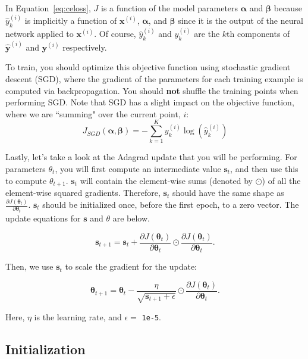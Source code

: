 \documentclass[11pt,addpoints,answers]{exam}
\newcommand{\sv}{\mathbf{s}}
\newcommand{\xv}{\mathbf{x}}
\newcommand{\yv}{\mathbf{y}}
\newcommand{\alphav     }{\boldsymbol \alpha     }
\newcommand{\betav      }{\boldsymbol \beta      }
\newcommand{\thetav     }{\boldsymbol \theta     }
\begin{document}
In Equation~\ref{eq:celoss}, $J$ is a function of the model parameters $\alphav$ and $\betav$ because $\hat{y}^{(i)}_k$ is implicitly a function of $\xv^{(i)}$, $\alphav$, and $\betav$ since it is the output of the neural network applied to $\xv^{(i)}$. Of course, $\hat{y}^{(i)}_k$ and $y_k^{(i)}$ are the $k$th components of $\hat{\yv}^{(i)}$ and $\yv^{(i)}$ respectively.

To train, you should optimize this objective function using stochastic gradient descent (SGD), where the gradient of the parameters for each training example is computed via backpropagation. You should \textbf{not} shuffle the training points when performing SGD. Note that SGD has a slight impact on the objective function, where we are ``summing" over the current point, $i$:
\begin{equation}
\label{eq:sgd_celoss}
J_{SGD}(\alphav, \betav)= -\sum_{k=1}^{K} y_k^{(i)} \log (\hat{y}^{(i)}_k)
\end{equation}

Lastly, let's take a look at the Adagrad update that you will be performing. For parameters $\theta_t$, you will first compute an intermediate value $\sv_t$, and then use this to compute $\theta_{t+1}$.
$\sv_t$ will contain the element-wise sums (denoted by $\odot$) of all the element-wise squared gradients. Therefore, $\sv_t$ should have the same shape as $\frac{\partial J(\thetav_{t})}{\partial \thetav_t}$. $\sv_t$ should be initialized once, before the first epoch, to a zero vector. The update equations for $\sv$ and $\theta$ are below.

\begin{equation}
    \label{eq:adagrad_s}
    \sv_{t+1} = \sv_{t} + \frac{\partial J(\thetav_{t})}{\partial \thetav_t} \odot \frac{\partial J(\thetav_{t})}{\partial \thetav_t}.
\end{equation}

Then, we use $\sv_t$ to scale the gradient for the update:

\begin{equation}
    \label{eq:adagrad_update}
    \thetav_{t+1} = \thetav_t - \frac{\eta}{\sqrt{\sv_{t+1} + \epsilon}} \odot \frac{\partial J(\thetav_t)}{ \partial \thetav_t}.
\end{equation}

Here, $\eta$ is the learning rate, and $\epsilon =$ \texttt{1e-5}.

\subsection{Initialization}
\label{sec:init}
\end{document}
